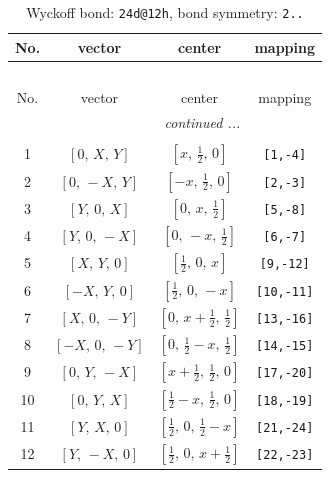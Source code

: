 \documentclass[fleqn,8pt]{jsarticle}
\begin{document}
\begin{longtable}{cccc}
\caption{Wyckoff bond: {\tt 24d@12h}, bond symmetry: {\tt 2..}}
 \\
 \hline \hline
No. & vector & center & mapping \\ \hline \endfirsthead

\multicolumn{3}{l}{\tablename\ \thetable{}} \\
 \hline \hline
No. & vector & center & mapping \\ \hline \endhead

 \hline \hline
\multicolumn{3}{r}{\footnotesize\it continued ...} \\ \endfoot

 \hline \hline
\multicolumn{3}{r}{} \\ \endlastfoot

1 & $\left[ 0,\, X,\, Y \right]$ & $\left[ x,\, \frac{1}{2},\, 0 \right]$ & {\tt [1,-4]} \\ \hline
2 & $\left[ 0,\, - X,\, Y \right]$ & $\left[ - x,\, \frac{1}{2},\, 0 \right]$ & {\tt [2,-3]} \\ \hline
3 & $\left[ Y,\, 0,\, X \right]$ & $\left[ 0,\, x,\, \frac{1}{2} \right]$ & {\tt [5,-8]} \\ \hline
4 & $\left[ Y,\, 0,\, - X \right]$ & $\left[ 0,\, - x,\, \frac{1}{2} \right]$ & {\tt [6,-7]} \\ \hline
5 & $\left[ X,\, Y,\, 0 \right]$ & $\left[ \frac{1}{2},\, 0,\, x \right]$ & {\tt [9,-12]} \\ \hline
6 & $\left[ - X,\, Y,\, 0 \right]$ & $\left[ \frac{1}{2},\, 0,\, - x \right]$ & {\tt [10,-11]} \\ \hline
7 & $\left[ X,\, 0,\, - Y \right]$ & $\left[ 0,\, x + \frac{1}{2},\, \frac{1}{2} \right]$ & {\tt [13,-16]} \\ \hline
8 & $\left[ - X,\, 0,\, - Y \right]$ & $\left[ 0,\, \frac{1}{2} - x,\, \frac{1}{2} \right]$ & {\tt [14,-15]} \\ \hline
9 & $\left[ 0,\, Y,\, - X \right]$ & $\left[ x + \frac{1}{2},\, \frac{1}{2},\, 0 \right]$ & {\tt [17,-20]} \\ \hline
10 & $\left[ 0,\, Y,\, X \right]$ & $\left[ \frac{1}{2} - x,\, \frac{1}{2},\, 0 \right]$ & {\tt [18,-19]} \\ \hline
11 & $\left[ Y,\, X,\, 0 \right]$ & $\left[ \frac{1}{2},\, 0,\, \frac{1}{2} - x \right]$ & {\tt [21,-24]} \\ \hline
12 & $\left[ Y,\, - X,\, 0 \right]$ & $\left[ \frac{1}{2},\, 0,\, x + \frac{1}{2} \right]$ & {\tt [22,-23]} \\ \hline

\end{longtable}
\end{document}
